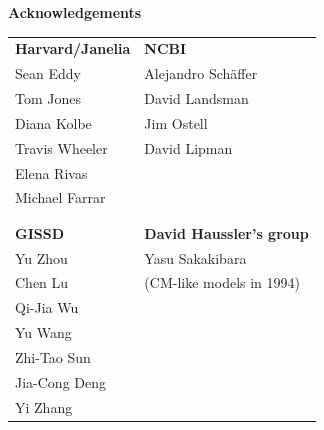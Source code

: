 \documentclass[landscape]{slides}
\begin{document}
\begin{slide}

\large
\begin{center}
\large{\textbf{Acknowledgements}} \\

\normalsize
\vspace{0.5in}

\begin{tabular}{l|l}
\textbf{Harvard/Janelia} & \textbf{NCBI} \\
Sean Eddy                &  Alejandro Sch\"{a}ffer \\
Tom Jones                &  David Landsman \\
Diana Kolbe              &  Jim Ostell \\
Travis Wheeler           &  David Lipman \\
Elena Rivas              &  \\
Michael Farrar           & \\
                & \\ \hline
                & \\
\textbf{GISSD}  & \textbf{David Haussler's group} \\
Yu Zhou         & Yasu Sakakibara \\
Chen Lu         &  (CM-like models in 1994) \\
Qi-Jia Wu       &  \\
Yu Wang         &  \\
Zhi-Tao Sun     &  \\
Jia-Cong Deng   &  \\
Yi Zhang        &  \\
\end{tabular}

\end{center}

\vfill
\end{slide}
\begin{slide}


\end{slide}
\end{document}
